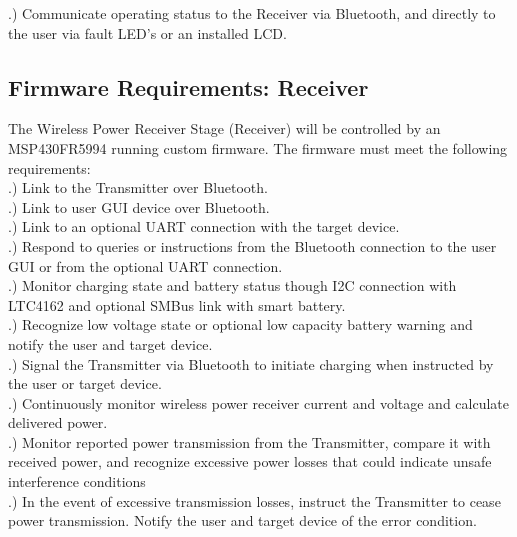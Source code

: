 \documentclass[12pt]{article}
\begin{document}
.) Communicate operating status to the Receiver via Bluetooth, and directly to the user via fault LED’s or an installed LCD.


\subsection{Firmware Requirements: Receiver}

\indent \indent
The Wireless Power Receiver Stage (Receiver) will be controlled by an MSP430FR5994 running custom firmware. The firmware must meet the following requirements:\\

.) Link to the Transmitter over Bluetooth.\\

.) Link to user GUI device over Bluetooth.\\

.) Link to an optional UART connection with the target device.\\

.) Respond to queries or instructions from the Bluetooth connection to the user GUI or from the optional UART connection.\\

.) Monitor charging state and battery status though I2C connection with LTC4162 and optional SMBus link with smart battery.\\

.) Recognize low voltage state or optional low capacity battery warning and notify the user and target device.\\

.) Signal the Transmitter via Bluetooth to initiate charging when instructed by the user or target device.\\

.) Continuously monitor wireless power receiver current and voltage and calculate delivered power.\\

.) Monitor reported power transmission from the Transmitter, compare it with received power, and recognize excessive power losses that could indicate unsafe interference conditions\\

.) In the event of excessive transmission losses, instruct the Transmitter to cease power transmission. Notify the user and target device of the error condition.\\
\end{document}
